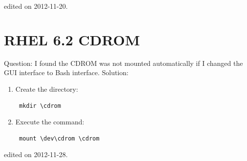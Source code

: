 \hfill {\tiny  edited on 2012-11-20.}

\section{RHEL 6.2 CDROM}
Question: I found the CDROM was not mounted automatically if I changed the GUI interface to Bash interface.
Solution: 
\begin{enumerate}[(1)]
    \item Create the directory: \begin{verbatim} mkdir \cdrom \end{verbatim} 
    \item Execute the command: \begin{verbatim} mount \dev\cdrom \cdrom \end{verbatim}
\end{enumerate}

\hfill {\tiny  edited on 2012-11-28.}

